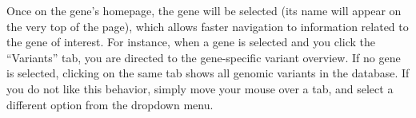 \documentclass[a4paper,oneside,openany,12pt]{memoir}
\begin{document}
Once on the gene's homepage, the gene will be selected (its name will appear on the very top of the page),
 which allows faster navigation to information related to the gene of interest.
For instance, when a gene is selected and you click the ``Variants'' tab, you are directed to the gene-specific variant overview.
If no gene is selected, clicking on the same tab shows all genomic variants in the database.
If you do not like this behavior, simply move your mouse over a tab, and select a different option from the dropdown menu.
%
\end{document}
